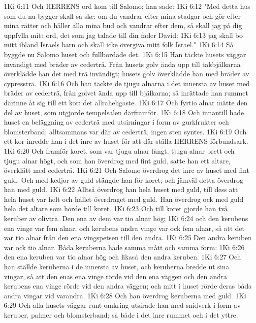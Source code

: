 1Ki 6:11  Och HERRENS ord kom till Salomo; han sade:
1Ki 6:12  "Med detta hus som du nu bygger skall så ske: om du vandrar efter mina stadgar och gör efter mina rätter och håller alla mina bud och vandrar efter dem, så skall jag på dig uppfylla mitt ord, det som jag talade till din fader David:
1Ki 6:13  jag skall bo mitt ibland Israels barn och skall icke övergiva mitt folk Israel."
1Ki 6:14  Så byggde nu Salomo huset och fullbordade det.
1Ki 6:15  Han täckte husets väggar invändigt med bräder av cederträ. Från husets golv ända upp till takbjälkarna överklädde han det med trä invändigt; husets golv överklädde han med bräder av cypressträ.
1Ki 6:16  Och han täckte de tjugu alnarna i det innersta av huset med bräder av cederträ, från golvet ända upp till bjälkarna; så inrättade han rummet därinne åt sig till ett kor: det allraheligaste.
1Ki 6:17  Och fyrtio alnar mätte den del av huset, som utgjorde tempelsalen därframför.
1Ki 6:18  Och innantill hade huset en beläggning av cederträ med utsirningar i form av gurkfrukter och blomsterband; alltsammans var där av cederträ, ingen sten syntes.
1Ki 6:19  Och ett kor inredde han i det inre av huset för att där ställa HERRENS förbundsark.
1Ki 6:20  Och framför koret, som var tjugu alnar långt, tjugu alnar brett och tjugu alnar högt, och som han överdrog med fint guld, satte han ett altare, överklätt med cederträ.
1Ki 6:21  Och Salomo överdrog det inre av huset med fint guld. Och med kedjor av guld stängde han för koret; och jämväl detta överdrog han med guld.
1Ki 6:22  Alltså överdrog han hela huset med guld, till dess att hela huset var helt och hållet överdraget med guld. Han överdrog ock med guld hela det altare som hörde till koret.
1Ki 6:23  Och till koret gjorde han två keruber av olivträ. Den ena av dem var tio alnar hög;
1Ki 6:24  och den kerubens ena vinge var fem alnar, och kerubens andra vinge var ock fem alnar, så att det var tio alnar från den ena vingspetsen till den andra.
1Ki 6:25  Den andra keruben var ock tio alnar. Båda keruberna hade samma mått och samma form:
1Ki 6:26  den ena keruben var tio alnar hög och likaså den andra keruben.
1Ki 6:27  Och han ställde keruberna i de innersta av huset, och keruberna bredde ut sina vingar, så att den enas ena vinge rörde vid den ena väggen och den andra kerubens ena vinge rörde vid den andra väggen; och mitt i huset rörde deras båda andra vingar vid varandra.
1Ki 6:28  Och han överdrog keruberna med guld.
1Ki 6:29  Och alla husets väggar runt omkring utsirade han med snidverk i form av keruber, palmer och blomsterband; så både i det inre rummet och i det yttre.
